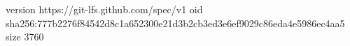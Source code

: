 version https://git-lfs.github.com/spec/v1
oid sha256:777b2276f84542d8c1a652300e21d3b2cb3ed3e6ef9029c86eda4e5986ec4aa5
size 3760
